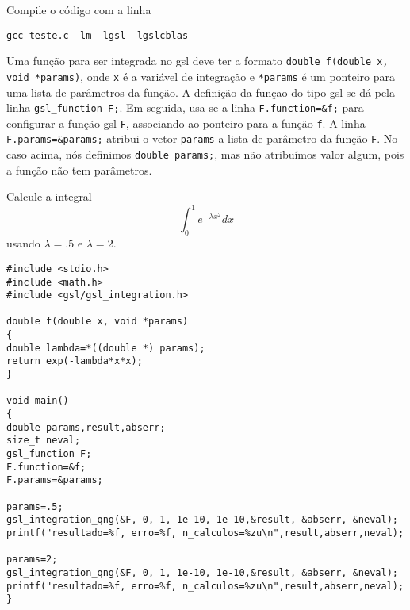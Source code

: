 Compile o código com a linha
\begin{verbatim}
gcc teste.c -lm -lgsl -lgslcblas
\end{verbatim}
Uma função para ser integrada no gsl deve ter a formato \verb|double f(double x, void *params)|, onde \verb|x| é a variável de integração e \verb|*params| é um ponteiro para uma lista de parâmetros da função. A definição da funçao do tipo gsl se dá pela linha \verb|gsl_function F;|. Em seguida, usa-se a linha \verb|F.function=&f;| para configurar a função gsl \verb|F|, associando ao ponteiro para a função \verb|f|. A linha \verb|F.params=&params;| atribui o vetor \verb|params| a lista de parâmetro da função \verb|F|. No caso acima, nós definimos \verb|double params;|, mas não atribuímos valor algum, pois a função não tem parâmetros.
\begin{ex}
Calcule a integral
$$
\int_0^1 e^{-\lambda x^2}dx
$$
usando $\lambda=.5$ e $\lambda=2$.
\end{ex}
\begin{verbatim}
#include <stdio.h>
#include <math.h>
#include <gsl/gsl_integration.h>

double f(double x, void *params)
{
double lambda=*((double *) params);
return exp(-lambda*x*x);
}

void main()
{
double params,result,abserr;
size_t neval;
gsl_function F;
F.function=&f;
F.params=&params;

params=.5;
gsl_integration_qng(&F, 0, 1, 1e-10, 1e-10,&result, &abserr, &neval);
printf("resultado=%f, erro=%f, n_calculos=%zu\n",result,abserr,neval);

params=2;
gsl_integration_qng(&F, 0, 1, 1e-10, 1e-10,&result, &abserr, &neval);
printf("resultado=%f, erro=%f, n_calculos=%zu\n",result,abserr,neval);
}
\end{verbatim}

